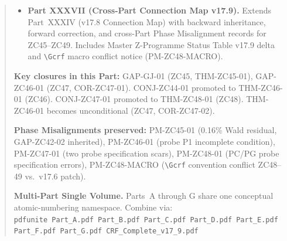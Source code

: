 \documentclass[12pt, a4paper]{article}
\begin{document}
\begin{abstract}
\begin{itemize}[leftmargin=2em]
\item \textbf{Part XXXVII (Cross-Part Connection Map v17.9).}
Extends Part~XXXIV (v17.8 Connection Map) with backward inheritance,
forward correction, and cross-Part Phase Misalignment records for
ZC45--ZC49. Includes Master Z-Programme Status Table v17.9 delta and
\texttt{\textbackslash Gcrf} macro conflict notice (PM-ZC48-MACRO).
\end{itemize}

\textbf{Key closures in this Part:}
GAP-GJ-01 (ZC45, THM-ZC45-01),
GAP-ZC46-01 (ZC47, COR-ZC47-01).
CONJ-ZC44-01 promoted to THM-ZC46-01 (ZC46).
CONJ-ZC47-01 promoted to THM-ZC48-01 (ZC48).
THM-ZC46-01 becomes unconditional (ZC47, COR-ZC47-02).

\textbf{Phase Misalignments preserved:}
PM-ZC45-01 (0.16\% Wald residual, GAP-ZC42-02 inherited),
PM-ZC46-01 (probe P1 incomplete condition),
PM-ZC47-01 (two probe specification scars),
PM-ZC48-01 (PC/PG probe specification errors),
PM-ZC48-MACRO (\texttt{\textbackslash Gcrf} convention conflict ZC48--49
vs.\ v17.6 patch).

\textbf{Multi-Part Single Volume.}
Parts~A through G share one conceptual atomic-numbering namespace.
Combine via:\\
\texttt{pdfunite Part\_A.pdf Part\_B.pdf Part\_C.pdf Part\_D.pdf
Part\_E.pdf Part\_F.pdf Part\_G.pdf CRF\_Complete\_v17\_9.pdf}
\end{abstract}

\tableofcontents
\newpage
\end{document}
